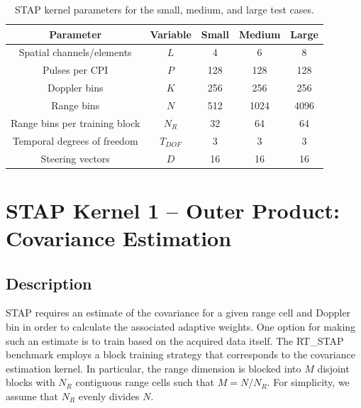 \documentclass{report}
\begin{document}
\begin{table}[t]
    \begin{center}
    \caption{STAP kernel parameters for the small, medium, and large test cases.}
    \begin{tabular}{|c|c|c|c|c|}
        \hline
        Parameter & Variable & Small & Medium & Large \\ \hline
        Spatial channels/elements & $L$ & 4 & 6 & 8 \\ \hline
        Pulses per CPI & $P$ & 128 & 128 & 128 \\ \hline
        Doppler bins & $K$ & 256 & 256 & 256\\ \hline
        Range bins & $N$ & 512 & 1024 & 4096 \\ \hline
        Range bins per training block & $N_R$ & 32 & 64 & 64 \\ \hline
        Temporal degrees of freedom & $T_{DOF}$ & 3 & 3 & 3 \\ \hline
        Steering vectors & $D$ & 16 & 16 & 16 \\ \hline
    \end{tabular}
    \label{tbl:stap:params}
    \end{center}
\end{table}


\section{STAP Kernel 1 -- Outer Product: \\ Covariance Estimation}
\label{sec:stap:cov}

\subsection{Description}

STAP requires an estimate of the covariance for a given range cell
and Doppler bin in order to calculate the associated adaptive weights.
One option for making such an estimate is to train based on the
acquired data itself.
The RT\_STAP benchmark employs a block training strategy that
corresponds to the covariance estimation kernel.
In particular, the range dimension is blocked into $M$ disjoint blocks
with $N_R$ contiguous range cells such that $M = N / N_R$.
For simplicity, we assume that $N_R$ evenly divides $N$.
\end{document}
